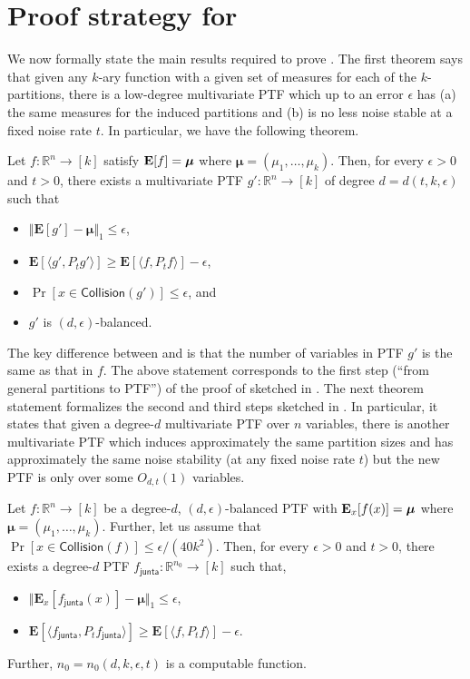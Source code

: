 \documentclass{toc}
\newcommand{\E}{{\bf E}}
\newcommand{\fh}{{f_{\mathsf{junta}}}}
\begin{document}
\section{Proof strategy for }
We now formally state the main results required to prove . The first theorem says that given any $k$-ary function with a given set of measures for each of the $k$-partitions, there is a low-degree multivariate PTF which up to an error $\epsilon$ has 
(a)  the same measures for the induced partitions and (b) is no less noise stable at a fixed noise rate $t$.
In particular, we have the following theorem. 
\begin{theorem}\label{thm:1}
  Let $f: \mathbb{R}^n \rightarrow [k]$ satisfy $\E[f] = \boldsymbol{\mu}$ where $\boldsymbol{\mu} = (\mu_1, \ldots, \mu_k)$. Then, for every
  $\epsilon>0$ and $t >0$, there exists a multivariate PTF $g': \mathbb{R}^n \rightarrow
  [k]$ of degree $d = d(t, k, \epsilon)$ such that
  \begin{itemize}
    \item $\Vert \mathbf{E}[g'] - \boldsymbol{\mu} \Vert_1 \le \epsilon$,
    \item $\mathbf{E}[\langle g', P_t g' \rangle] \ge\mathbf{E}[ \langle f, P_t f \rangle] - \epsilon$,
    \item $\Pr [x \in \mathsf{Collision} (g')] \le \epsilon$, and
  \item $g'$ is $(d, \epsilon)$-balanced.
  \end{itemize}
\end{theorem}
The key difference between  and  is that the number of variables in PTF $g'$ is the same as that in $f$. The above statement corresponds to the first step (``from general partitions to PTF'') of the proof of  sketched in . The next theorem statement formalizes the second and third steps sketched in . In particular, it states that given a degree-$d$ multivariate PTF over $n$ variables, there is another multivariate PTF which induces approximately the same partition sizes and has approximately the same noise stability (at any fixed noise rate $t$) but the new PTF is only over some $O_{d,t}(1)$ variables.
\begin{theorem}\label{thm:reduction}
  Let $f: \mathbb{R}^n \rightarrow [k]$ be a degree-$d$, $(d,\epsilon)$-balanced  PTF with $\E_{x}[f(x)] = \boldsymbol{\mu}$ where $\boldsymbol{\mu} = (\mu_1, \ldots, \mu_k)$.  Further, let us assume that 
$\Pr[x \in \mathsf{Collision} (f)] \le \epsilon/(40 k^2)$.  
  Then, for every $\epsilon>0$ and $t > 0$, there exists a degree-$d$ 
PTF $\fh: \mathbb{R}^{n_0} \rightarrow [k]$ such that, \begin{itemize} \item  $\Vert \mathbf{E}_{x} [\fh(x)] - \boldsymbol{\mu} \Vert_1 \le \epsilon$, \item $ \mathbf{E}[\langle \fh, P_t \fh \rangle] \ge \mathbf{E}[\langle f, P_t f \rangle] - \epsilon$. %
\end{itemize} Further, $n_0 = n_0 (d,k,\epsilon, t)$ is a computable function.   
\end{theorem}
\end{document}
